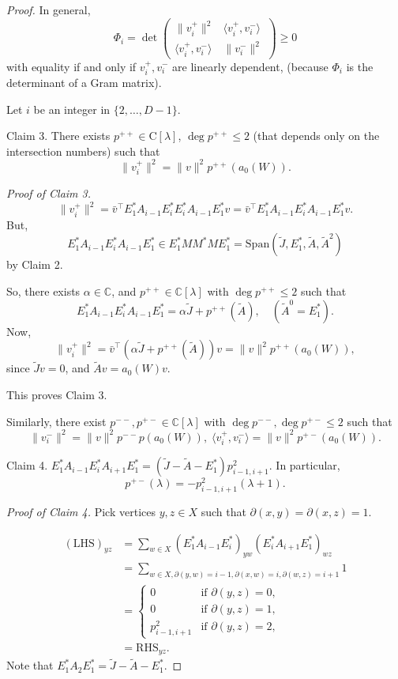 \documentclass[
]{book}
\theoremstyle{definition}
\theoremstyle{definition}
\theoremstyle{definition}
\theoremstyle{definition}
\theoremstyle{remark}
\begin{document}
\begin{proof}
In general,
\[\Phi_i = \det \begin{pmatrix}\|v^+_i\|^2 & \langle v^+_i, v^-_i\rangle\\
\langle v^+_i,v^-_i\rangle & \|v^-_i\|^2 \end{pmatrix} \geq 0\]
with equality if and only if \(v^+_i, v^-_i\) are linearly dependent,
(because \(\Phi_i\) is the determinant of a Gram matrix).

Let \(i\) be an integer in \(\{2, \ldots, D-1\}\).

Claim 3. There exists \(p^{++}\in \mathrm{C}[\lambda]\), \(\deg p^{++}\leq 2\) (that depends only on the intersection numbers)
such that
\[\|v^+_i\|^2 = \|v\|^2 p^{++}(a_0(W)).\]

\emph{Proof of Claim 3.}
\[\|v^+_i\|^2  = \bar{v}^\top E^*_1A_{i-1}E^*_iE^*_iA_{i-1}E^*_1v = \bar{v}^\top E^*_1A_{i-1}E^*_iA_{i-1}E^*_1v.\]
But,
\[E^*_1A_{i-1}E^*_iA_{i-1}E^*_1 \in E^*_1MM^*ME^*_1 = \mathrm{Span}(\tilde{J}, E^*_1, \tilde{A}, \tilde{A}^2)\]
by Claim 2.

So, there exists \(\alpha \in \mathbb{C}\), and \(p^{++}\in \mathbb{C}[\lambda]\) with \(\deg p^{++}\leq 2\) such that
\[E^*_1A_{i-1}E^*_iA_{i-1}E^*_1 = \alpha \tilde{J} + p^{++}(\tilde{A}), \quad (\tilde{A}^0 = E^*_1).\]
Now,
\[\|v^+_i\|^2 = \bar{v}^\top (\alpha \tilde{J} + p^{++}(\tilde{A}))v = \|v\|^2 p^{++}(a_0(W)),\]
since \(\tilde{J}v = 0\), and \(\tilde{A}v = a_0(W)v\).

This proves Claim 3.

Similarly, there exist \(p^{--}, p^{+-}\in \mathbb{C}[\lambda]\) with \(\deg p^{--}, \deg p^{+-}\leq 2\) such that
\[\|v^-_i\|^2 = \|v\|^2p^{--}p(a_0(W)), \; \langle v^+_i, v^-_i\rangle = \|v\|^2 p^{+-}(a_0(W)).\]

Claim 4. \(E^*_1A_{i-1}E^*_iA_{i+1}E^*_1 = (\tilde{J}-\tilde{A}-E^*_1)p^2_{i-1,i+1}\). In particular,
\[p^{+-}(\lambda) = -p^2_{i-1,i+1}(\lambda +1).\]

\emph{Proof of Claim 4.}
Pick vertices \(y,z\in X\) such that \(\partial(x,y) = \partial(x,z) = 1\).

\begin{align}
(\mathrm{LHS})_{yz} & = \sum_{w\in X}(E^*_1A_{i-1}E^*_i)_{yw}(E^*_iA_{i+1}E^*_1)_{wz}\\
& = \sum_{w\in X, \partial(y,w)=i-1,\partial(x,w)=i, \partial(w,z)=i+1}1\\
& = \begin{cases}
0 & \text{if } \partial(y,z) =0,\\
0 & \text{if } \partial(y,z) = 1, \\
p^2_{i-1,i+1} & \text{if }\partial(y,z)=2,
\end{cases}\\
& = \mathrm{RHS}_{yz}.
\end{align}
Note that \(E^*_1A_2E^*_1 = \tilde{J}- \tilde{A} - E^*_1\).


\end{proof}
\end{document}
